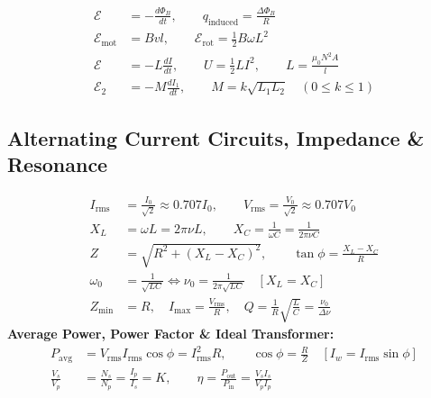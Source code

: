 \documentclass[10pt,twoside,openright]{book}
\begin{document}
\begin{formulabox}
\begin{align}
  \mathcal{E} &= -\frac{d\Phi_B}{dt}, \qquad q_{\text{induced}} = \frac{\Delta\Phi_B}{R} \\
  \mathcal{E}_{\text{mot}} &= B v l, \qquad \mathcal{E}_{\text{rot}} = \frac{1}{2}B\omega L^2 \\
  \mathcal{E} &= -L\frac{dI}{dt}, \qquad U = \frac{1}{2}L I^2, \qquad L = \frac{\mu_0 N^2 A}{l} \\
  \mathcal{E}_2 &= -M\frac{dI_1}{dt}, \qquad M = k\sqrt{L_1 L_2} \quad (0 \le k \le 1)
\end{align}
\end{formulabox}

\subsection{Alternating Current Circuits, Impedance \& Resonance}

\begin{formulabox}
\begin{align}
  I_{\text{rms}} &= \frac{I_0}{\sqrt{2}} \approx 0.707 I_0, \qquad V_{\text{rms}} = \frac{V_0}{\sqrt{2}} \approx 0.707 V_0 \\
  X_L &= \omega L = 2\pi\nu L, \qquad X_C = \frac{1}{\omega C} = \frac{1}{2\pi\nu C} \\
  Z &= \sqrt{R^2 + (X_L - X_C)^2}, \qquad \tan\phi = \frac{X_L - X_C}{R} \\
  \omega_0 &= \frac{1}{\sqrt{LC}} \iff \nu_0 = \frac{1}{2\pi\sqrt{LC}} \quad [X_L = X_C] \\
  Z_{\min} &= R, \quad I_{\max} = \frac{V_{\text{rms}}}{R}, \quad Q = \frac{1}{R}\sqrt{\frac{L}{C}} = \frac{\nu_0}{\Delta\nu}
\end{align}
\textbf{Average Power, Power Factor \& Ideal Transformer:}
\begin{align}
  P_{\text{avg}} &= V_{\text{rms}} I_{\text{rms}} \cos\phi = I_{\text{rms}}^2 R, \qquad \cos\phi = \frac{R}{Z} \quad [I_w = I_{\text{rms}}\sin\phi] \\
  \frac{V_s}{V_p} &= \frac{N_s}{N_p} = \frac{I_p}{I_s} = K, \qquad \eta = \frac{P_{\text{out}}}{P_{\text{in}}} = \frac{V_s I_s}{V_p I_p}
\end{align}
\end{formulabox}

\newpage
\end{document}
